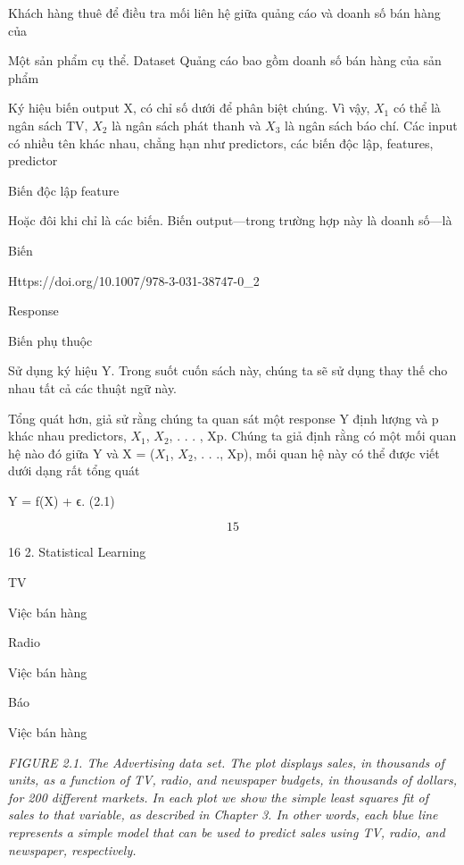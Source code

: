 Khách hàng thuê để điều tra mối liên hệ giữa quảng cáo và doanh số bán hàng của

Một sản phẩm cụ thể. Dataset Quảng cáo bao gồm doanh số bán hàng của sản phẩm

Ký hiệu biến output X, có chỉ số dưới để phân biệt chúng. Vì vậy, $X_{1}$ có thể là ngân sách TV, $X_{2}$ là ngân sách phát thanh và $X_{3}$ là ngân sách báo chí. Các input có nhiều tên khác nhau, chẳng hạn như predictors, các biến độc lập, features, predictor

Biến độc lập feature

Hoặc đôi khi chỉ là các biến. Biến output—trong trường hợp này là doanh số—là

Biến

Https://doi.org/10.1007/978-3-031-38747-0\_2

Response

Biến phụ thuộc

Sử dụng ký hiệu Y. Trong suốt cuốn sách này, chúng ta sẽ sử dụng thay thế cho nhau tất cả các thuật ngữ này.

Tổng quát hơn, giả sử rằng chúng ta quan sát một response Y định lượng và p khác nhau predictors, $X_{1}$, $X_{2}$, . . . , Xp. Chúng ta giả định rằng có một mối quan hệ nào đó giữa Y và X = ($X_{1}$, $X_{2}$, . . ., Xp), mối quan hệ này có thể được viết dưới dạng rất tổng quát

Y = f(X) + ϵ. (2.1)

\[15\]

16 2. Statistical Learning

TV

Việc bán hàng

Radio

Việc bán hàng

Báo

Việc bán hàng

\noindent\textit{FIGURE 2.1. The Advertising data set. The plot displays sales, in thousands of units, as a function of TV, radio, and newspaper budgets, in thousands of dollars, for 200 different markets. In each plot we show the simple least squares fit of sales to that variable, as described in Chapter 3. In other words, each blue line represents a simple model that can be used to predict sales using TV, radio, and newspaper, respectively.}

